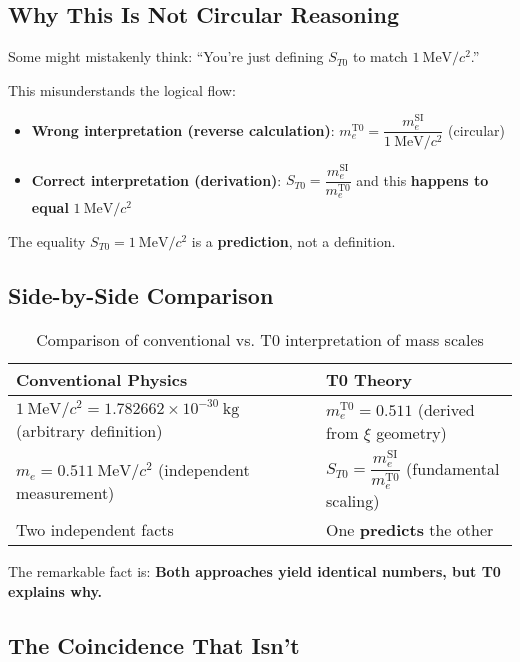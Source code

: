 \documentclass[12pt,a4paper]{article}
\begin{document}
	\subsection{Why This Is Not Circular Reasoning}
	
	Some might mistakenly think: ``You're just defining $S_{T0}$ to match $1~\mathrm{MeV}/c^2$.''
	
	This misunderstands the logical flow:
	
	\begin{itemize}
		\item \textbf{Wrong interpretation (reverse calculation)}: 
		$m_e^{\mathrm{T0}} = \dfrac{m_e^{\mathrm{SI}}}{1~\mathrm{MeV}/c^2}$ (circular)
		
		\item \textbf{Correct interpretation (derivation)}: 
		$S_{T0} = \dfrac{m_e^{\mathrm{SI}}}{m_e^{\mathrm{T0}}}$ and this \textbf{happens to equal} $1~\mathrm{MeV}/c^2$
	\end{itemize}
	
	The equality $S_{T0} = 1~\mathrm{MeV}/c^2$ is a \textbf{prediction}, not a definition.
	
	\subsection{Side-by-Side Comparison}
	
	\begin{table}[h]
		\centering
		\begin{tabular}{p{6cm}p{6cm}}
			\toprule
			\textbf{Conventional Physics} & \textbf{T0 Theory} \\
			\midrule
			$1~\mathrm{MeV}/c^2 = 1.782662\times 10^{-30}~\mathrm{kg}$ (arbitrary definition) & $m_e^{\mathrm{T0}} = 0.511$ (derived from $\xi$ geometry) \\
			$m_e = 0.511~\mathrm{MeV}/c^2$ (independent measurement) & $S_{T0} = \dfrac{m_e^{\mathrm{SI}}}{m_e^{\mathrm{T0}}}$ (fundamental scaling) \\
			Two independent facts & One \textbf{predicts} the other \\
			\bottomrule
		\end{tabular}
		\caption{Comparison of conventional vs. T0 interpretation of mass scales}
	\end{table}
	
	The remarkable fact is: \textbf{Both approaches yield identical numbers, but T0 explains why.}
	
	\subsection{The Coincidence That Isn't}
	
\end{document}
